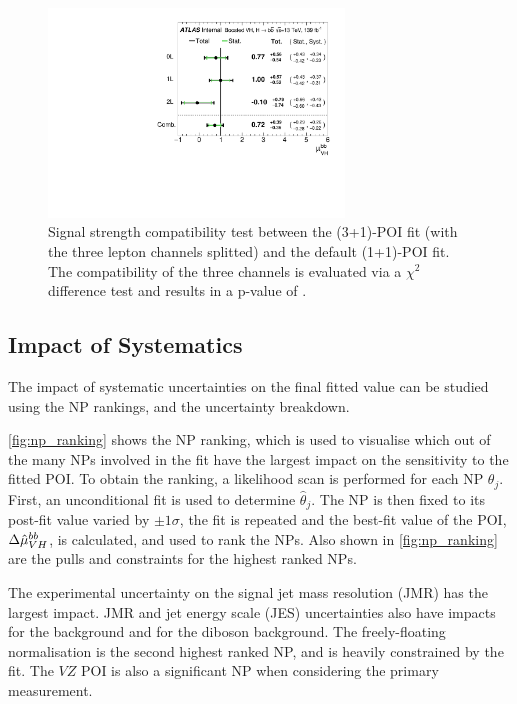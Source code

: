 \begin{figure}[!htbp]
  \centering
  \includegraphics[width=0.7\textwidth]{chapters/6.vhbb_boosted/figs/Plot_mu_102_VH.pdf}
  \caption{
    Signal strength compatibility test between the (3+1)-POI fit (with the three lepton channels splitted) and the default (1+1)-POI fit.
    The compatibility of the three channels is evaluated via a $\chi^2$ difference test and results in a p-value of  \cite{HIGG-2018-52}.
  }
  \label{fig:channel_comp}
\end{figure}



\subsection{Impact of Systematics}\label{sec:sys_results}

The impact of systematic uncertainties on the final fitted value \muhatbb can be studied using the NP rankings, and the uncertainty breakdown.

\cref{fig:np_ranking} shows the NP ranking, which is used to visualise which out of the many NPs involved in the fit have the largest impact on the sensitivity to the fitted POI.
To obtain the ranking, a likelihood scan is performed for each NP $\theta_j$.
First, an unconditional fit is used to determine $\hat{\theta}_j$.
The NP is then fixed to its post-fit value varied by $\pm 1 \sigma$, the fit is repeated and the best-fit value of the POI, $\Delta \hat{\mu}_{VH}^{bb}$, is calculated, and used to rank the NPs.
Also shown in \cref{fig:np_ranking} are the pulls and constraints for the highest ranked NPs.

The experimental uncertainty on the signal \largeR jet mass resolution (JMR) has the largest impact.
JMR and jet energy scale (JES) uncertainties also have impacts for the \Vjets background and for the diboson background.
The freely-floating \Zhf normalisation is the second highest ranked NP, and is heavily constrained by the fit.
The $VZ$ POI \muVZ is also a significant NP when considering the primary \muVH measurement.

